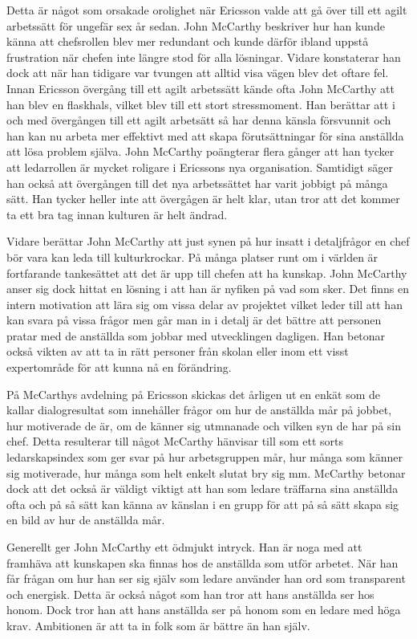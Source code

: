Detta är något som orsakade orolighet när Ericsson valde att gå över till ett agilt arbetssätt för ungefär sex år sedan. John McCarthy beskriver hur han kunde känna att chefsrollen blev mer redundant och kunde därför ibland uppstå frustration när chefen inte längre stod för alla lösningar. Vidare konstaterar han dock att när han tidigare var tvungen att alltid visa vägen blev det oftare fel. Innan Ericsson övergång till ett agilt arbetssätt kände ofta John McCarthy att han blev en flaskhals, vilket blev till ett stort stressmoment. Han berättar att i och med övergången till ett agilt arbetsätt så har denna känsla försvunnit och han kan nu arbeta mer effektivt med att skapa förutsättningar för sina anställda att lösa problem själva. John McCarthy poängterar flera gånger att han tycker att ledarrollen är mycket roligare i Ericssons nya organisation. Samtidigt säger han också att övergången till det nya arbetssättet har varit jobbigt på många sätt. Han tycker heller inte att övergågen är helt klar, utan tror att det kommer ta ett bra tag innan kulturen är helt ändrad.

Vidare berättar John McCarthy att just synen på hur insatt i detaljfrågor en chef bör vara kan leda till kulturkrockar. På många platser runt om i världen är fortfarande tankesättet att det är upp till chefen att ha kunskap. John McCarthy anser sig dock hittat en lösning i att han är nyfiken på vad som sker. Det finns en intern motivation att lära sig om vissa delar av projektet vilket leder till att han kan svara på vissa frågor men går man in i detalj är det bättre att personen pratar med de anställda som jobbar med utvecklingen dagligen. Han betonar också vikten av att ta in rätt personer från skolan eller inom ett visst expertområde för att kunna nå en förändring.

På McCarthys avdelning på Ericsson skickas det årligen ut en enkät som de kallar dialogresultat som innehåller frågor om hur de anställda mår på jobbet, hur motiverade de är, om de känner sig utmnanade och vilken syn de har på sin chef. Detta resulterar till något McCarthy hänvisar till som ett sorts ledarskapsindex som ger svar på hur arbetsgruppen mår, hur många som känner sig motiverade, hur många som helt enkelt slutat bry sig mm. McCarthy betonar dock att det också är väldigt viktigt att han som ledare träffarna sina anställda ofta och på så sätt kan känna av känslan i en grupp för att på så sätt skapa sig en bild av hur de anställda mår.

Generellt ger John McCarthy ett ödmjukt intryck. Han är noga med att framhäva att kunskapen ska finnas hos de anställda som utför arbetet. När han får frågan om hur han ser sig själv som ledare använder han ord som transparent och energisk. Detta är också något som han tror att hans anställda ser hos honom. Dock tror han att hans anställda ser på honom som en ledare med höga krav. Ambitionen är att ta in folk som är bättre än han själv.